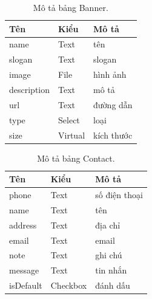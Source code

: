 \documentclass[11pt]{report}
\begin{document}
	
	\begin{table}[h!]
		\begin{center}
			\caption{Mô tả bảng Banner.}
			\begin{tabularx}{0.6\textwidth}{ |l|l|X| } 
				\hline
				Tên & Kiểu & Mô tả \\
				\hline
				name & Text & tên \\
				slogan & Text & slogan \\
				image & File & hình ảnh \\
				description & Text & mô tả \\
				url & Text & đường dẫn \\
				type & Select & loại \\
				size & Virtual & kích thước \\ 
				\hline
			\end{tabularx}
			\label{table:Banner}
		\end{center}
	\end{table}
	
	
	\begin{table}[h!]
		\begin{center}
			\caption{Mô tả bảng Contact.}
			\begin{tabularx}{0.6\textwidth}{ |l|l|X| } 
				\hline
				Tên & Kiểu & Mô tả \\
				\hline
				phone & Text & số điện thoại \\
				name & Text & tên \\
				address & Text & địa chỉ \\
				email & Text & email \\
				note & Text & ghi chú \\
				message & Text & tin nhắn \\
				isDefault & Checkbox & đánh dấu \\ 
				\hline
			\end{tabularx}
			\label{table:Contact}
		\end{center}
	\end{table}
	
\end{document}
